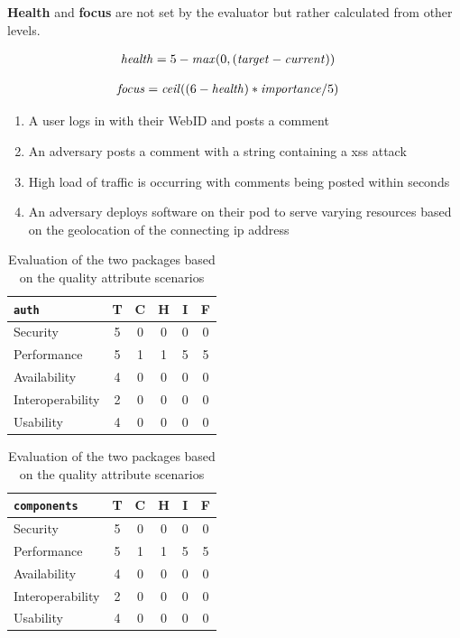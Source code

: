 \textbf{Health} and \textbf{focus} are not set by the evaluator but rather calculated from other levels.

\begin{align*}
    \text{\textit{health}}&=5 - \text{\textit{max}}(0, (\text{\textit{target}} - \text{\textit{current}}))
\end{align*}

\begin{align*}
    \text{\textit{focus}}&= \text{\textit{ceil}}((6 - \text{\textit{health}}) * \text{\textit{importance}}/5)
\end{align*}

\begin{enumerate}
    \item A user logs in with their WebID and posts a comment
    \item An adversary posts a comment with a string containing a \gls{xss} attack
    \item High load of traffic is occurring with comments being posted within seconds
    \item An adversary deploys software on their pod to serve varying resources based on the geolocation of the connecting \gls{ip} address
\end{enumerate}

\begin{table}[h!]
    \centering
    \begin{tabular}{| l | c | c | c | c | c |} 
     \hline
     \texttt{auth} & T & C & H & I & F \\
     \hline
     Security & 5 & 0 & 0 & 0 & 0\\
     \hline
     Performance & 5 & 1 & 1 & 5 & \cellcolor{red!50}5\\
     \hline
     Availability & 4 & 0 & 0 & 0 & 0\\
     \hline
     Interoperability & 2 & 0 & 0 & 0 & 0\\
     \hline
     Usability & 4 & 0 & 0 & 0 & 0\\
     \hline
    \end{tabular}
    \quad
    \begin{tabular}{| l | c | c | c | c | c |} 
     \hline
     \texttt{components} & T & C & H & I & F \\
     \hline
     Security & 5 & 0 & 0 & 0 & 0\\
     \hline
     Performance & 5 & 1 & 1 & 5 & \cellcolor{red!50}5\\
     \hline
     Availability & 4 & 0 & 0 & 0 & 0\\
     \hline
     Interoperability & 2 & 0 & 0 & 0 & 0\\
     \hline
     Usability & 4 & 0 & 0 & 0 & 0\\
     \hline
    \end{tabular}
    \vspace{0.75cm}
    \caption{Evaluation of the two packages based on the quality attribute scenarios}
    \label{table:poc1-evaluation}
\end{table}

